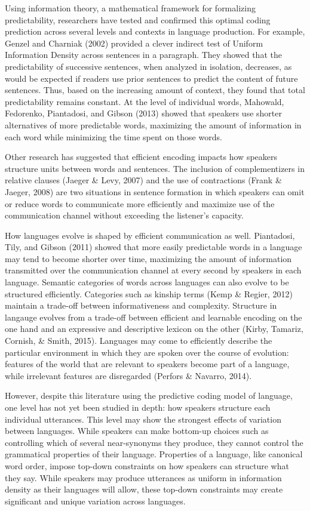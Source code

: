 \documentclass[
  english,
  man,floatsintext]{apa6}
\begin{document}
Using information theory, a mathematical framework for formalizing predictability, researchers have tested and confirmed this optimal coding prediction across several levels and contexts in language production. For example, Genzel and Charniak (2002) provided a clever indirect test of Uniform Information Density across sentences in a paragraph. They showed that the predictability of successive sentences, when analyzed in isolation, decreases, as would be expected if readers use prior sentences to predict the content of future sentences. Thus, based on the increasing amount of context, they found that total predictability remains constant. At the level of individual words, Mahowald, Fedorenko, Piantadosi, and Gibson (2013) showed that speakers use shorter alternatives of more predictable words, maximizing the amount of information in each word while minimizing the time spent on those words.

Other research has suggested that efficient encoding impacts how speakers structure units between words and sentences. The inclusion of complementizers in relative clauses (Jaeger \& Levy, 2007) and the use of contractions (Frank \& Jaeger, 2008) are two situations in sentence formation in which speakers can omit or reduce words to communicate more efficiently and maximize use of the communication channel without exceeding the listener's capacity.

How languages evolve is shaped by efficient communication as well. Piantadosi, Tily, and Gibson (2011) showed that more easily predictable words in a language may tend to become shorter over time, maximizing the amount of information transmitted over the communication channel at every second by speakers in each language. Semantic categories of words across languages can also evolve to be structured efficiently. Categories such as kinship terms (Kemp \& Regier, 2012) maintain a trade-off between informativeness and complexity. Structure in langauge evolves from a trade-off between efficient and learnable encoding on the one hand and an expressive and descriptive lexicon on the other (Kirby, Tamariz, Cornish, \& Smith, 2015). Languages may come to efficiently describe the particular environment in which they are spoken over the course of evolution: features of the world that are relevant to speakers become part of a language, while irrelevant features are disregarded (Perfors \& Navarro, 2014).

However, despite this literature using the predictive coding model of language, one level has not yet been studied in depth: how speakers structure each individual utterances. This level may show the strongest effects of variation between languages. While speakers can make bottom-up choices such as controlling which of several near-synonyms they produce, they cannot control the grammatical properties of their language. Properties of a language, like canonical word order, impose top-down constraints on how speakers can structure what they say. While speakers may produce utterances as uniform in information density as their languages will allow, these top-down constraints may create significant and unique variation across languages.
\end{document}
